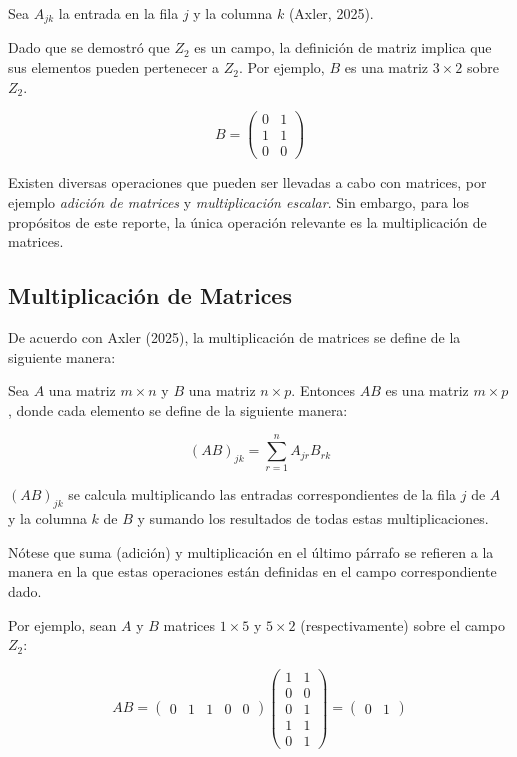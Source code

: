 \documentclass{article}
\begin{document}
Sea $A_{jk}$ la entrada en la fila $j$ y la columna $k$ (Axler, 2025).

Dado que se demostró que $Z_2$ es un campo, la definición de matriz implica que sus elementos pueden pertenecer a $Z_2$. Por ejemplo, $B$ es una matriz $ 3 \times 2 $ sobre $ Z_2 $.

$$
B = \begin{pmatrix}
    0 & 1 \\
    1 & 1 \\
    0 & 0
\end{pmatrix}
$$

Existen diversas operaciones que pueden ser llevadas a cabo con matrices, por ejemplo \textit{adición de matrices} y \textit{multiplicación escalar}. Sin embargo, para los propósitos de este reporte, la única operación relevante es la multiplicación de matrices.

\subsection{Multiplicación de Matrices}

De acuerdo con Axler (2025), la multiplicación de matrices se define de la siguiente manera:

Sea $A$ una matriz $m \times n$ y $B$ una matriz $n \times p$. Entonces $AB$ es una matriz $ m \times p $, donde cada elemento se define de la siguiente manera:

$$
(AB)_{jk} = \sum_{r=1}^n A_{jr} B_{rk}
$$

$(AB)_{jk}$ se calcula multiplicando las entradas correspondientes de la fila $j$ de $A$ y la columna $k$ de $B$ y sumando los resultados de todas estas multiplicaciones.

Nótese que suma (adición) y multiplicación en el último párrafo se refieren a la manera en la que estas operaciones están definidas en el campo correspondiente dado. 

Por ejemplo, sean $A$ y $B$ matrices $1 \times 5$ y $5 \times 2$ (respectivamente) sobre el campo $Z_2$:

$$
AB = \begin{pmatrix}
    0 & 1 & 1 & 0 & 0
\end{pmatrix}
\begin{pmatrix}
    1 & 1 \\
    0 & 0 \\
    0 & 1 \\
    1 & 1 \\
    0 & 1
\end{pmatrix}
= \begin{pmatrix}
    0 & 1
\end{pmatrix}
$$
\end{document}
